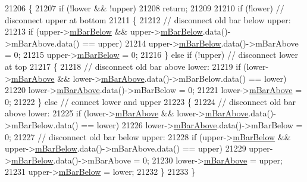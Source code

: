 \begin{DoxyCode}
21206                                                         \{
21207   \textcolor{keywordflow}{if} (!lower && !upper)
21208     \textcolor{keywordflow}{return};
21209 
21210   \textcolor{keywordflow}{if} (!lower) \textcolor{comment}{// disconnect upper at bottom}
21211   \{
21212     \textcolor{comment}{// disconnect old bar below upper:}
21213     \textcolor{keywordflow}{if} (upper->\hyperlink{class_q_c_p_bars_ad51db970eed7e286f2753b0216fc56de}{mBarBelow} && upper->\hyperlink{class_q_c_p_bars_ad51db970eed7e286f2753b0216fc56de}{mBarBelow}.data()->mBarAbove.data() == upper)
21214       upper->\hyperlink{class_q_c_p_bars_ad51db970eed7e286f2753b0216fc56de}{mBarBelow}.data()->mBarAbove = 0;
21215     upper->\hyperlink{class_q_c_p_bars_ad51db970eed7e286f2753b0216fc56de}{mBarBelow} = 0;
21216   \} \textcolor{keywordflow}{else} \textcolor{keywordflow}{if} (!upper) \textcolor{comment}{// disconnect lower at top}
21217   \{
21218     \textcolor{comment}{// disconnect old bar above lower:}
21219     \textcolor{keywordflow}{if} (lower->\hyperlink{class_q_c_p_bars_a0c1c46076c41a478dbb373cfd35929aa}{mBarAbove} && lower->\hyperlink{class_q_c_p_bars_a0c1c46076c41a478dbb373cfd35929aa}{mBarAbove}.data()->mBarBelow.data() == lower)
21220       lower->\hyperlink{class_q_c_p_bars_a0c1c46076c41a478dbb373cfd35929aa}{mBarAbove}.data()->mBarBelow = 0;
21221     lower->\hyperlink{class_q_c_p_bars_a0c1c46076c41a478dbb373cfd35929aa}{mBarAbove} = 0;
21222   \} \textcolor{keywordflow}{else} \textcolor{comment}{// connect lower and upper}
21223   \{
21224     \textcolor{comment}{// disconnect old bar above lower:}
21225     \textcolor{keywordflow}{if} (lower->\hyperlink{class_q_c_p_bars_a0c1c46076c41a478dbb373cfd35929aa}{mBarAbove} && lower->\hyperlink{class_q_c_p_bars_a0c1c46076c41a478dbb373cfd35929aa}{mBarAbove}.data()->mBarBelow.data() == lower)
21226       lower->\hyperlink{class_q_c_p_bars_a0c1c46076c41a478dbb373cfd35929aa}{mBarAbove}.data()->mBarBelow = 0;
21227     \textcolor{comment}{// disconnect old bar below upper:}
21228     \textcolor{keywordflow}{if} (upper->\hyperlink{class_q_c_p_bars_ad51db970eed7e286f2753b0216fc56de}{mBarBelow} && upper->\hyperlink{class_q_c_p_bars_ad51db970eed7e286f2753b0216fc56de}{mBarBelow}.data()->mBarAbove.data() == upper)
21229       upper->\hyperlink{class_q_c_p_bars_ad51db970eed7e286f2753b0216fc56de}{mBarBelow}.data()->mBarAbove = 0;
21230     lower->\hyperlink{class_q_c_p_bars_a0c1c46076c41a478dbb373cfd35929aa}{mBarAbove} = upper;
21231     upper->\hyperlink{class_q_c_p_bars_ad51db970eed7e286f2753b0216fc56de}{mBarBelow} = lower;
21232   \}
21233 \}
\end{DoxyCode}


